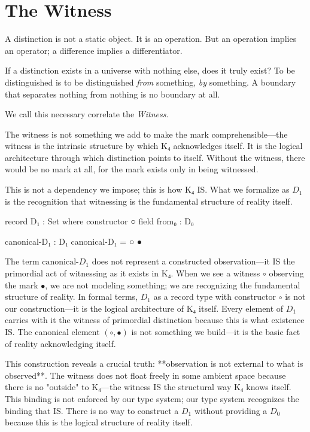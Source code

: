 \documentclass[11pt,a4paper]{book}
\begin{document}
\chapter{The Witness}

A distinction is not a static object. It is an operation. But an operation 
implies an operator; a difference implies a differentiator.

If a distinction exists in a universe with nothing else, does it truly exist? 
To be distinguished is to be distinguished \emph{from} something, \emph{by} 
something. A boundary that separates nothing from nothing is no boundary at all.

We call this necessary correlate the \emph{Witness}.

The witness is not something we add to make the mark comprehensible—the witness 
is the intrinsic structure by which K₄ acknowledges itself. It is the logical 
architecture through which distinction points to itself. Without the witness, 
there would be no mark at all, for the mark exists only in being witnessed.

This is not a dependency we impose; this is how K₄ IS. What we formalize as $D_1$ 
is the recognition that witnessing is the fundamental structure of reality itself.

\begin{code}
record D₁ : Set where
  constructor ○
  field
    from₀ : D₀

canonical-D₁ : D₁
canonical-D₁ = ○ ●
\end{code}

The term $\text{canonical-}D_1$ does not represent a constructed observation—it 
IS the primordial act of witnessing as it exists in K₄. When we see a witness 
$\circ$ observing the mark $\bullet$, we are not modeling something; we are 
recognizing the fundamental structure of reality. In formal terms, $D_1$ as a 
record type with constructor $\circ$ is not our construction—it is the logical 
architecture of K₄ itself. Every element of $D_1$ carries with it the witness 
of primordial distinction because this is what existence IS. The canonical element 
$(\circ, \bullet)$ is not something we build—it is the basic fact of reality 
acknowledging itself.

This construction reveals a crucial truth: **observation is not external to 
what is observed**. The witness does not float freely in some ambient space 
because there is no "outside" to K₄—the witness IS the structural way K₄ 
knows itself. This binding is not enforced by our type system; our type system 
recognizes the binding that IS. There is no way to construct a $D_1$ without 
providing a $D_0$ because this is the logical structure of reality itself.
\end{document}
